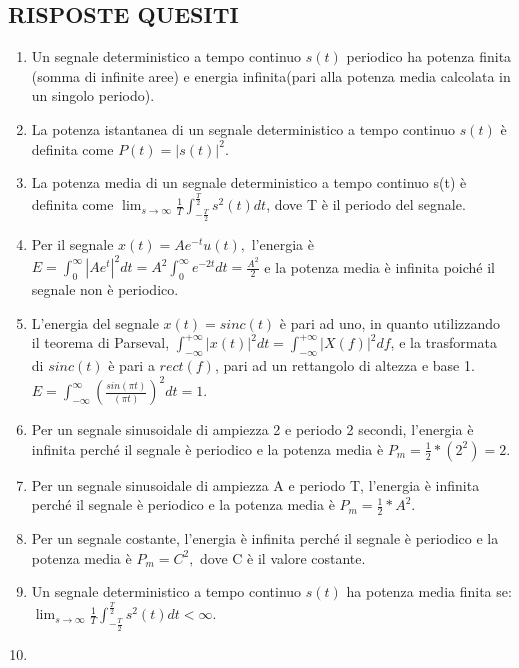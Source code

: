 \documentclass[
]{article}
\begin{document}
\hypertarget{risposte-quesiti}{%
	\subsection{RISPOSTE QUESITI}\label{risposte-quesiti}}

\begin{enumerate}
	\def\labelenumi{\arabic{enumi}.} 
	\item
	Un segnale deterministico a tempo continuo \(s(t)\) periodico ha
	potenza finita (somma di infinite aree) e energia infinita(pari alla potenza media calcolata in un singolo periodo).
	\item
	La potenza istantanea di un segnale deterministico a tempo continuo
	\(s(t)\) è definita come \(P(t) = |s(t)|^2\).
	\item
	La potenza media di un segnale deterministico a tempo continuo s(t) è
	definita come $ \displaystyle \lim_{s\to\infty} \frac{1}{T} \int_{-\frac{T}{2}}^{\frac{T}{2}} s^2(t)dt$, dove T è il 	periodo del segnale.
	\item
	Per il segnale $x(t) = Ae^{-t}u(t),$ l'energia è $ E = \int_0^\infty |Ae^{t}|^2 dt = A^2 \int_0^\infty e^{-
		2t} dt = \frac{A^2}{2}$ e la potenza media è infinita poiché il segnale non è periodico.
	\item
	L'energia del segnale \(x(t) = sinc(t)\) è pari ad uno, in quanto utilizzando il teorema di Parseval,
	$\int_{-\infty}^{+\infty}|x(t)|^2dt = \int_{-\infty}^{+\infty}|X(f)|^2df$, e la trasformata 
	di $sinc(t)$ è pari a $rect(f)$, pari ad un rettangolo di altezza e base 1.
	\(E = \int_{-\infty}^\infty (\frac{sin(\pi t)}{( \pi t)})^2 dt = 1.\)
	\item
	Per un segnale sinusoidale di ampiezza 2 e periodo 2 secondi,
	l'energia è infinita perché il segnale è periodico e la potenza media
	è \(P_m = \frac{1}{2} * (2^2) = 2.\)
	\item
	Per un segnale sinusoidale di ampiezza A e periodo T, l'energia è
	infinita perché il segnale è periodico e la potenza media è
	\(P_m = \frac{1}{2} * A^2\).
	\item
	Per un segnale costante, l'energia è infinita perché il segnale è
	periodico e la potenza media è \(P_m = C^2,\) dove C è il valore
	costante.
	\item
	Un segnale deterministico a tempo continuo \(s(t)\) ha potenza media
	finita se: \newline $ \displaystyle \lim_{s\to\infty} \frac{1}{T} \int_{-\frac{T}{2}}^{\frac{T}{2}} s^2(t)dt < \infty$.
	\item

\end{enumerate}
\end{document}
